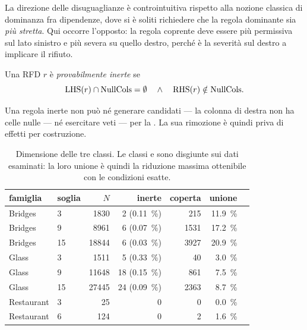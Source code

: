 \begin{remark}
La direzione delle disuguaglianze è controintuitiva rispetto alla nozione classica di dominanza
fra dipendenze, dove si è soliti richiedere che la regola dominante sia \emph{più stretta}. Qui
occorre l'opposto: la regola coprente deve essere più permissiva sul lato sinistro e più severa
su quello destro, perché è la severità sul destro a implicare il rifiuto.
\end{remark}

\begin{definition}\label{def:v3}
Una RFD $r$ è \emph{provabilmente inerte} se
\[
    \mathrm{LHS}(r) \cap \mathrm{NullCols} = \emptyset \quad \wedge \quad \mathrm{RHS}(r) \notin \mathrm{NullCols} .
\]
\end{definition}

Una regola inerte non può né generare candidati --- la colonna di destra non ha celle nulle --- né
esercitare veti --- per la \Vone{}. La sua rimozione è quindi priva di effetti per costruzione.

\begin{table}[htbp]
\centering
\caption{Dimensione delle tre classi. Le classi \Vtwo{} e \Vthree{} sono disgiunte sui dati
esaminati: la loro unione è quindi la riduzione massima ottenibile con le condizioni esatte.}
\label{tab:conditions}
\footnotesize
\begin{tabular}{llrrrrr}
\toprule
famiglia & soglia & $N$ & \Vthree{} inerte & \Vtwo{} coperta & unione \\
\midrule
Bridges    & 3  & \num{1830}  & 2 (\SI{0.11}{\percent}) & 215  & \SI{11.9}{\percent} \\
Bridges    & 9  & \num{8961}  & 6 (\SI{0.07}{\percent}) & \num{1531} & \SI{17.2}{\percent} \\
Bridges    & 15 & \num{18844} & 6 (\SI{0.03}{\percent}) & \num{3927} & \SI{20.9}{\percent} \\
Glass      & 3  & \num{1511}  & 5 (\SI{0.33}{\percent}) & 40   & \SI{3.0}{\percent} \\
Glass      & 9  & \num{11648} & 18 (\SI{0.15}{\percent}) & 861 & \SI{7.5}{\percent} \\
Glass      & 15 & \num{27445} & 24 (\SI{0.09}{\percent}) & \num{2363} & \SI{8.7}{\percent} \\
Restaurant & 3  & 25          & 0 & 0   & \SI{0.0}{\percent} \\
Restaurant & 6  & 124         & 0 & 2   & \SI{1.6}{\percent} \\
\bottomrule
\end{tabular}
\end{table}

